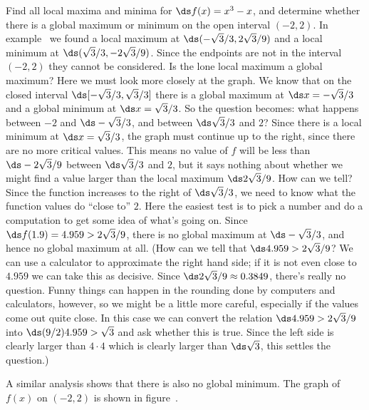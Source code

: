 \begin{example}
Find all local maxima and minima for $\ds f(x)=x^3-x$, and determine whether
there is a global maximum or minimum on the open interval 
$(-2,2)$. In example~ we found a local maximum at $\ds (-\sqrt3/3,2\sqrt{3}/9)$ and a
local minimum at $\ds (\sqrt3/3,-2\sqrt{3}/9)$. Since the endpoints are
not in the interval $(-2,2)$ they cannot be considered.
Is the lone local maximum
a global maximum? Here we must look more closely at the graph. 
We know that on the closed interval $\ds [-\sqrt3/3,\sqrt3/3]$ there is a
global maximum at $\ds x=-\sqrt3/3$ and a global minimum at $\ds x=\sqrt3/3$.
So the question becomes: what happens between $-2$ and $\ds -\sqrt3/3$, and between
$\ds \sqrt3/3$ and $2$? Since there is a local minimum at $\ds x=\sqrt3/3$,
the graph must continue up to the right, since there are no more
critical values. This means no value of $f$ will be less than 
$\ds -2\sqrt{3}/9$ between $\ds \sqrt3/3$ and $2$, but it says nothing about
whether we might find a value larger than the local maximum
$\ds 2\sqrt{3}/9$.
How can we tell? Since the function increases to the right of
$\ds \sqrt3/3$, we need to know what the function values do ``close to''
$2$. Here the easiest test is to pick a number and do a computation to
get some idea of what's going on. Since $\ds f(1.9)=4.959>2\sqrt{3}/9$,
there is no global maximum at $\ds -\sqrt3/3$, and hence no global maximum
at all. (How can we tell that $\ds 4.959>2\sqrt{3}/9$? We can use a
calculator to approximate the right hand side; if it is not even close
to $4.959$ we can take this as decisive. Since 
$\ds 2\sqrt{3}/9\approx 0.3849$, there's really no question.
Funny things can happen in
the rounding done by computers and calculators, however, so we might
be a little more careful, especially if the values come out quite
close.
In this case we can convert the relation $\ds 4.959>2\sqrt{3}/9$ into 
$\ds (9/2) 4.959>\sqrt{3}$ and ask whether this is true. Since the left side
is clearly larger than $4\cdot 4$ which is clearly larger than
$\ds \sqrt3$, this settles the question.)

A similar analysis shows that there is also no global minimum.
The
graph of $f(x)$ on $(-2,2)$ is shown in 
figure~.
\end{example}

